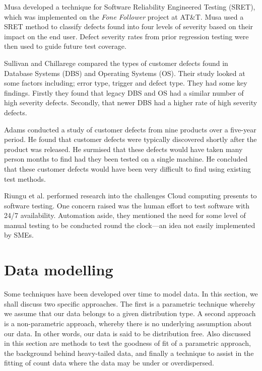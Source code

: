 Musa \cite{musa1996software} developed a technique for Software Reliability Engineered Testing (SRET), which was implemented on the \emph{Fone Follower} project at AT\&T. Musa used a SRET method to classify defects found into four levels of severity based on their impact on the end user. Defect severity rates from prior regression testing were then used to guide future test coverage. \par

Sullivan and Chillarege \cite{sullivan1992comparison} compared the types of customer defects found in Database Systems (DBS) and Operating Systems (OS). Their study looked at some factors including; error type, trigger and defect type. They had some key findings. Firstly they found that legacy DBS and OS had a similar number of high severity defects. Secondly, that newer DBS had a higher rate of high severity defects. \par

Adams \cite{adams1984optimizing} conducted a study of customer defects from nine products over a five-year period. He found that customer defects were typically discovered shortly after the product was released. He surmised that these defects would have taken many person months to find had they been tested on a single machine. He concluded that these customer defects would have been very difficult to find using existing test methods. \par

Riungu et al. \cite{riungu2010research} performed research into the challenges Cloud computing presents to software testing. One concern raised was the human effort to test software with 24/7 availability. Automation aside, they mentioned the need for some level of manual testing to be conducted round the clock---an idea not easily implemented by SMEs.

\section{Data modelling}

Some techniques have been developed over time to model data. In this section, we shall discuss two specific approaches. The first is a parametric technique whereby we assume that our data belongs to a given distribution type. A second approach is a non-parametric approach, whereby there is no underlying assumption about our data. In other words, our data is said to be distribution free. Also discussed in this section are methods to test the goodness of fit of a parametric approach, the background behind heavy-tailed data, and finally a technique to assist in the fitting of count data where the data may be under or overdispersed.

